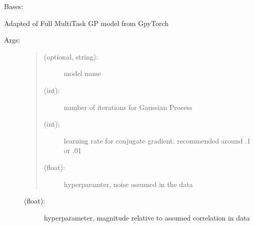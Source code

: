 \documentclass[letterpaper,10pt,english,openany,oneside]{sphinxmanual}
\begin{document}
\begin{fulllineitems}
\label{\detokenize{gp:methods.mtl.MTL_GP.GPyFullMTL}}
Bases: {\hyperref[\detokenize{base:methods.base.BaseMTLEstimator}]{}}

Adapted of Full MultiTask GP model from GpyTorch
\begin{description}
\item[{Args:}] \leavevmode\begin{quote}
\begin{description}
\item[{ (optional, string):}] \leavevmode
model name

\item[{ (int):}] \leavevmode
number of iterations for Gaussian Process

\item[{ (int):}] \leavevmode
learning rate for conjugate gradient. recommended around .1 or .01

\item[{ (float):}] \leavevmode
hyperparamter, noise assumed in the data

\end{description}
\end{quote}
\begin{description}
\item[{ (float):}] \leavevmode
hyperparameter, magnitude relative to assumed correlation in data


\end{description}
\end{description}
\end{fulllineitems}
\end{document}
